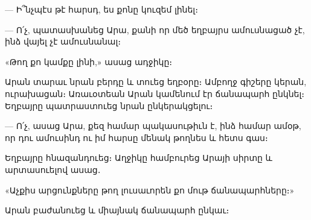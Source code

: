 \documentclass{article}
\begin{document}
{— Ի՞նչպէս թէ հարսդ, ես քոնը կուզեմ լինել։

— Ո՛չ, պատասխանեց Արա, քանի որ մեծ եղբայրս ամուսնացած չէ, ինձ վայել չէ ամուսնանալ։

«Թող քո կամքը լինի,» ասաց ադջիկը։

Արան տարաւ նրան բերդը և տուեց եղբօրը։ Ամբողջ գիշերը կերան, ուրախացան։ Առաւօտեան Արան կամենում էր ճանապարհ ընկնել։ Եղբայրը պատրաստուեց նրան ընկերակցելու։

— Ո՛չ, ասաց Արա, քեզ համար պակասութիւն է, ինձ համար ամօթ, որ դու ամուսինդ ու իմ հարսը մենակ թողնես և հետս գաս։

Եղբայրը հնազանդուեց։ Աղջիկը համբուրեց Արայի սիրտը և արտասուելով ասաց․

«Աչքիս արցունքները թող լուսաւորեն քո մութ ճանապարհները։»

Արան բաժանուեց և միայնակ ճանապարհ ընկաւ։}
\clearpage
\section{}
\end{document}
